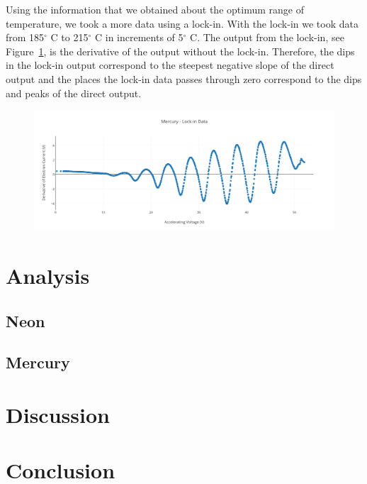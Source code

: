 \documentclass[prb,preprint]{revtex4-1}
\begin{document}
Using the information that we obtained about the optimum range of temperature, we took a more data using a lock-in. With the lock-in we took data from 185$^{\circ}$ C to 215$^{\circ}$ C in increments of 5$^{\circ}$ C. The output from the lock-in, see Figure~\ref{hg_lockin}, is the derivative of the output without the lock-in. Therefore, the dips in the lock-in output correspond to the steepest negative slope of the direct output and the places the lock-in data passes through zero correspond to the dips and peaks of the direct output.

\begin{figure}[h!]
\centering

\includegraphics[width=6in]{hg_lockin.pdf}
\caption{}

\label{hg_lockin}
\end{figure}



\section{Analysis}

\subsection{Neon}
\subsection{Mercury}

\section{Discussion}


\section{Conclusion}
\end{document}
